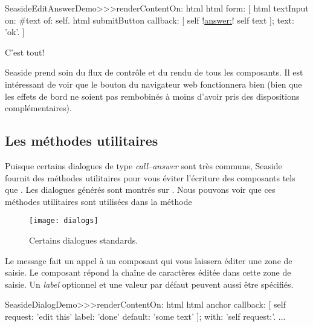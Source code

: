 \documentclass[a4paper,10pt,twoside]{book}
\begin{document}
\begin{code}{}
SeasideEditAnswerDemo>>>renderContentOn: html
	html form: [
		html textInput
			on: #text of: self.
		html submitButton
			callback: [ self !\underline{answer:}! self text ];
			text: 'ok'.
		]
\end{code}{}

C'est tout!

Seaside prend soin du flux de contrôle et du rendu de tous les
composants.
Il est intéressant de voir que le bouton \backbtn{} du navigateur web
fonctionnera bien (bien que les effets de bord ne soient pas
rembobinés à moins d'avoir pris des dispositions complémentaires).

\subsection{Les méthodes utilitaires}

Puisque certains dialogues de type \emph{call--answer} sont très
communs, Seaside fournit des méthodes utilitaires pour vous éviter
l'écriture des composants tels que .
Les dialogues générés sont montrés sur .
Nous pouvons voir que ces méthodes utilitaires sont utilisées dans la
méthode 

\begin{figure}[b]
\begin{center}
\texttt{[image: dialogs]}
\caption{Certains dialogues standards.}
\end{center}
\end{figure}

Le message  fait un appel à un composant
qui vous laissera éditer une zone de saisie. Le composant répond la
chaîne de caractères éditée
dans cette zone de saisie.
Un \emph{label} optionnel et une valeur par défaut peuvent aussi être
spécifiés.

\begin{code}{}
SeasideDialogDemo>>>renderContentOn: html
	html anchor
		callback: [ self request: 'edit this' label: 'done' default: 'some text' ];
		with: 'self request:'.
...
\end{code}
\end{document}

